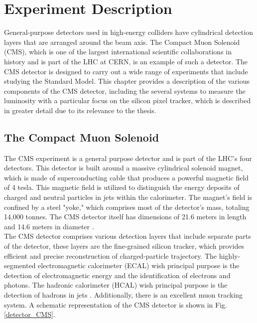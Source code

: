 \chapter{Experiment Description}
 
 General-purpose detectors used in high-energy colliders have cylindrical detection layers that are arranged around the beam axis. The Compact Muon Solenoid (CMS), which is one of the largest international scientific collaborations in history and is part of the LHC at CERN, is an example of such a detector. The CMS detector is designed to carry out a wide range of experiments that include studying the Standard Model. This chapter provides a description of the various components of the CMS detector, including the several systems to measure the luminosity with a particular focus on the silicon pixel tracker, which is described in greater detail due to its relevance to the thesis.
 
\section{The Compact Muon Solenoid}

The CMS experiment is a general purpose detector and is part of the LHC's four detectors. This detector is built around a massive cylindrical solenoid magnet, which is made of superconducting cable that produces a powerful magnetic field of 4 tesla. This magnetic field is utilized to distinguish the energy deposits of charged and neutral particles in jets within the calorimeter. The magnet's field is confined by a steel "yoke," which comprises most of the detector's mass, totaling 14,000 tonnes. The CMS detector itself has dimensions of 21.6 meters in length and 14.6 meters in diameter \cite{CMS_Exp_2008}.\\

The CMS detector comprises various detection layers that include separate parts of the detector, these layers are the fine-grained silicon tracker, which provides efficient and precise reconstruction of charged-particle trajectory. The highly-segmented electromagnetic calorimeter (ECAL) wish principal purpose is the detection of  electromagnetic energy and the identification of electrons and photons. The hadronic calorimeter (HCAL) wish principal purpose is the detection of hadrons in jets  \cite{CMS_Exp_2008}. Additionally, there is an excellent muon tracking system. A schematic representation of the CMS detector is shown in Fig. \ref{detector_CMS}.

